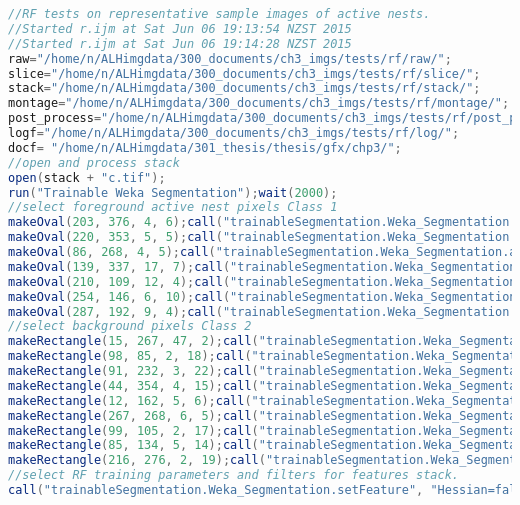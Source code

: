 \begin{lstlisting}[language=java, caption=Trainable segmentation on variable nest images., label=cd:threshold-variable-rf]
//RF tests on representative sample images of active nests.
//Started r.ijm at Sat Jun 06 19:13:54 NZST 2015
//Started r.ijm at Sat Jun 06 19:14:28 NZST 2015
raw="/home/n/ALHimgdata/300_documents/ch3_imgs/tests/rf/raw/"; 
slice="/home/n/ALHimgdata/300_documents/ch3_imgs/tests/rf/slice/"; 
stack="/home/n/ALHimgdata/300_documents/ch3_imgs/tests/rf/stack/"; 
montage="/home/n/ALHimgdata/300_documents/ch3_imgs/tests/rf/montage/"; 
post_process="/home/n/ALHimgdata/300_documents/ch3_imgs/tests/rf/post_process/"; 
logf="/home/n/ALHimgdata/300_documents/ch3_imgs/tests/rf/log/"; 
docf= "/home/n/ALHimgdata/301_thesis/thesis/gfx/chp3/";
//open and process stack
open(stack + "c.tif"); 
run("Trainable Weka Segmentation");wait(2000);
//select foreground active nest pixels Class 1
makeOval(203, 376, 4, 6);call("trainableSegmentation.Weka_Segmentation.addTrace", "0", "1");
makeOval(220, 353, 5, 5);call("trainableSegmentation.Weka_Segmentation.addTrace", "0", "2");
makeOval(86, 268, 4, 5);call("trainableSegmentation.Weka_Segmentation.addTrace", "0", "3");
makeOval(139, 337, 17, 7);call("trainableSegmentation.Weka_Segmentation.addTrace", "0", "4");
makeOval(210, 109, 12, 4);call("trainableSegmentation.Weka_Segmentation.addTrace", "0", "4");
makeOval(254, 146, 6, 10);call("trainableSegmentation.Weka_Segmentation.addTrace", "0", "5");
makeOval(287, 192, 9, 4);call("trainableSegmentation.Weka_Segmentation.addTrace", "0", "6");
//select background pixels Class 2
makeRectangle(15, 267, 47, 2);call("trainableSegmentation.Weka_Segmentation.addTrace", "1", "1");
makeRectangle(98, 85, 2, 18);call("trainableSegmentation.Weka_Segmentation.addTrace", "1", "1");
makeRectangle(91, 232, 3, 22);call("trainableSegmentation.Weka_Segmentation.addTrace", "1", "1");
makeRectangle(44, 354, 4, 15);call("trainableSegmentation.Weka_Segmentation.addTrace", "1", "2");
makeRectangle(12, 162, 5, 6);call("trainableSegmentation.Weka_Segmentation.addTrace", "1", "3");
makeRectangle(267, 268, 6, 5);call("trainableSegmentation.Weka_Segmentation.addTrace", "1", "5");
makeRectangle(99, 105, 2, 17);call("trainableSegmentation.Weka_Segmentation.addTrace", "1", "5");
makeRectangle(85, 134, 5, 14);call("trainableSegmentation.Weka_Segmentation.addTrace", "1", "6");
makeRectangle(216, 276, 2, 19);call("trainableSegmentation.Weka_Segmentation.addTrace", "1", "6");
//select RF training parameters and filters for features stack.
call("trainableSegmentation.Weka_Segmentation.setFeature", "Hessian=false");

\end{lstlisting}
